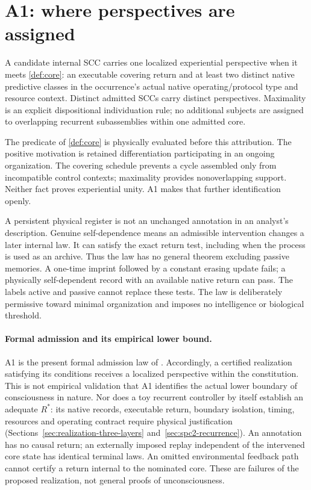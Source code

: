 \section{A1: where perspectives are assigned}\label{section:spc:perspectival-cores}
\begin{constitution}\label{ax:A1}
A candidate internal SCC carries one localized experiential perspective
when it meets \cref{def:core}: an executable covering return and at least two distinct native predictive classes in the occurrence's actual native operating/protocol type and resource context. Distinct
admitted SCCs carry distinct perspectives. Maximality is an explicit
dispositional individuation rule; no additional subjects are assigned to
overlapping recurrent subassemblies within one admitted core.
\end{constitution}
The predicate of \cref{def:core} is physically evaluated before this attribution. The positive motivation is retained differentiation participating in an ongoing organization. The covering schedule prevents a cycle assembled only from incompatible control contexts; maximality provides nonoverlapping support. Neither fact proves experiential unity. A1 makes that further identification openly.

A persistent physical register is not an unchanged annotation in an analyst's description. Genuine self-dependence means an admissible intervention changes a later internal law. It can satisfy the exact return test, including when the process is used as an archive. Thus the law has no general theorem excluding passive memories. A one-time imprint followed by a constant erasing update fails; a physically self-dependent record with an available native return can pass. The labels active and passive cannot replace these tests. The law is deliberately permissive toward minimal organization and imposes no intelligence or biological threshold.

\paragraph{Formal admission and its empirical lower bound.}
A1 is the present formal admission law of \spctwo. Accordingly, a certified realization satisfying its conditions receives a localized perspective within the constitution. This is not empirical validation that A1 identifies the actual lower boundary of consciousness in nature. Nor does a toy recurrent controller by itself establish an adequate $R^\ast$: its native records, executable return, boundary isolation, timing, resources and operating contract require physical justification (Sections~\ref{sec:realization-three-layers} and~\ref{sec:spc2-recurrence}). An annotation has no causal return; an externally imposed replay independent of the intervened core state has identical terminal laws. An omitted environmental feedback path cannot certify a return internal to the nominated core. These are failures of the proposed realization, not general proofs of unconsciousness.

